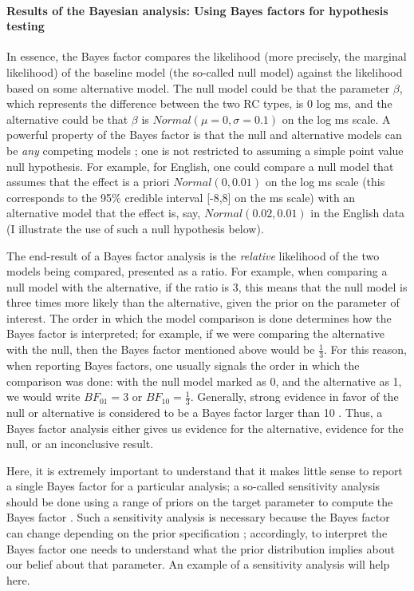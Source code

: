 \documentclass{ar-1col}\usepackage[]{graphicx}\usepackage[]{color}
\begin{document}
\paragraph{Results of the Bayesian analysis: Using Bayes factors for hypothesis testing}

In essence, the Bayes factor compares the likelihood (more precisely, the marginal likelihood) of the baseline model (the so-called null model) against the likelihood based on some alternative model.
The null model could be that the parameter $\beta$, which represents the difference between the two RC types, is 0 log ms, and the alternative could be that $\beta$ is $\mathit{Normal}(\mu=0,\sigma=0.1)$  on the log ms scale. A powerful property of the Bayes factor is that the null and alternative models can be \textit{any} competing models \citep[e.g.,][]{rouder2021there}; one is not restricted to assuming a simple point value null hypothesis. For example, for English, one could compare a null model that assumes that the effect is a priori $\mathit{Normal}(0,0.01)$ on the log ms scale (this corresponds to the 95\% credible interval  [-8,8] on the ms scale) with an alternative model that the effect is, say, $\mathit{Normal}(0.02,0.01)$ in the English data (I illustrate the use of such a null hypothesis below).

The end-result of a Bayes factor analysis is the \textit{relative} likelihood of the two models being compared, presented  as a ratio. For example, when comparing a null model with the alternative, if the ratio is $3$, this means that the null model is three times more likely than the alternative, given the prior on the parameter of interest. The order in which the model comparison is done determines how the Bayes factor is interpreted; for example, if we were comparing the alternative with the null, then the Bayes factor mentioned above would be $\frac{1}{3}$. For this reason, when reporting Bayes factors, one usually signals the order in which the comparison was done: with the null model marked as 0, and the alternative as 1, we would write $BF_{01} = 3$ or $BF_{10}=\frac{1}{3}$. Generally, strong evidence in favor of the null or alternative is considered to be a Bayes factor larger than 10 \citep[this follows from a suggested scale in][]{jeffreys1998theory}. Thus, a Bayes factor analysis either gives us evidence for the alternative, evidence for the null, or an inconclusive result. 

Here, it is extremely important to understand that it makes little sense to report a single Bayes factor for a particular analysis; a so-called sensitivity analysis should be done using a range of priors on the target parameter to compute the Bayes factor \citep{SchadEtAlBF}. Such a sensitivity analysis is necessary because the Bayes factor can change depending on the prior specification \citep{lee2014bayesian}; accordingly, to interpret the Bayes factor one needs to understand what the prior distribution implies about our belief about that parameter.  An example of a sensitivity analysis will help here.
\end{document}
